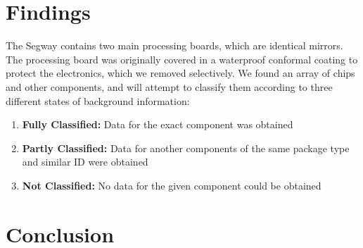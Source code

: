 \documentclass[]{formalLabReport}
\begin{document}
\section{Findings}
The Segway contains two main processing boards, which are identical mirrors. The processing board was
originally covered in a waterproof conformal coating to protect the electronics, which we removed selectively.
We found an array of chips and other components, and will attempt to classify them according to 
three different states of background information:
\begin{enumerate}
    \item \textbf{Fully Classified:} Data for the exact component was obtained
    \item \textbf{Partly Classified:} Data for another components of the same package type and 
    similar ID were obtained
    \item \textbf{Not Classified:} No data for the given component could be obtained
\end{enumerate}

\section{Conclusion}
\end{document}
